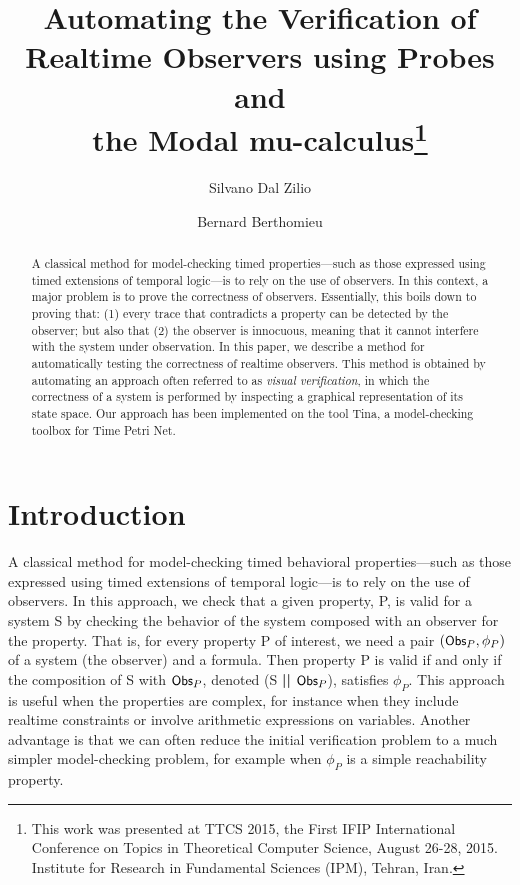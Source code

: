 \documentclass[a4paper]{scrartcl}
\def\code#1{\textsf{\small\bfseries #1}}
\def\vars#1{\textsf{\small #1}}
\begin{document}
\title{Automating the Verification of\\ Realtime Observers using
  Probes and\\ the Modal mu-calculus\thanks{This work was presented at TTCS 2015, the First IFIP International
Conference on Topics in Theoretical Computer Science, August 26-28,
2015.  Institute for Research in Fundamental Sciences (IPM), Tehran,
Iran.}}
\author[1,2]{Silvano Dal Zilio}
\author[1,2]{Bernard Berthomieu}
\date{}
\maketitle
\begin{abstract}
  A classical method for model-checking timed properties---such as
  those expressed using timed extensions of temporal logic---is to
  rely on the use of observers. In this context, a major problem is to
  prove the correctness of observers. Essentially, this boils down to
  proving that: (1) every trace that contradicts a property can be
  detected by the observer; but also that (2) the observer is
  innocuous, meaning that it cannot interfere with the system under
  observation. In this paper, we describe a method for automatically
  testing the correctness of realtime observers. This method is
  obtained by automating an approach often referred to as \emph{visual
    verification}, in which the correctness of a system is performed
  by inspecting a graphical representation of its state space. Our
  approach has been implemented on the tool Tina, a model-checking
  toolbox for Time Petri Net.
\end{abstract}



\section{Introduction}
\label{sec:introduction}

A classical method for model-checking timed behavioral
properties---such as those expressed using timed extensions of
temporal logic---is to rely on the use of observers. In this approach,
we check that a given property, \vars{P}, is valid for a system
\vars{S} by checking the behavior of the system composed with an
observer for the property. That is, for every property \vars{P} of
interest, we need a pair $(\vars{Obs}_P, \phi_{P})$ of a system (the
observer) and a formula. Then property \vars{P} is valid if and only
if the composition of \vars{S} with $\vars{Obs}_P$, denoted (\vars{S}
\code{||} $\vars{Obs}_P$), satisfies $\phi_{P}$. This approach is
useful when the properties are complex, for instance when they include
realtime constraints or involve arithmetic expressions on
variables. Another advantage is that we can often reduce the initial
verification problem to a much simpler model-checking problem, for
example when $\phi_{P}$ is a simple reachability property.
\end{document}
